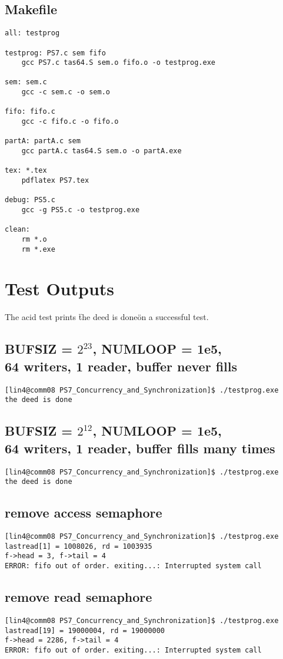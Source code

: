 \documentclass[12pt]{article}
\begin{document}
\subsection{Makefile}

\begin{lstlisting}
all: testprog

testprog: PS7.c sem fifo
    gcc PS7.c tas64.S sem.o fifo.o -o testprog.exe

sem: sem.c
    gcc -c sem.c -o sem.o

fifo: fifo.c
    gcc -c fifo.c -o fifo.o

partA: partA.c sem
    gcc partA.c tas64.S sem.o -o partA.exe

tex: *.tex
    pdflatex PS7.tex

debug: PS5.c
    gcc -g PS5.c -o testprog.exe

clean:
    rm *.o
    rm *.exe
\end{lstlisting}

\section {Test Outputs}

The acid test prints \"the deed is done\" on a successful test.

\subsection {BUFSIZ = $2^{23}$, NUMLOOP = 1e5, \\
64 writers, 1 reader, buffer never fills}
\begin{lstlisting}
[lin4@comm08 PS7_Concurrency_and_Synchronization]$ ./testprog.exe 
the deed is done
\end{lstlisting}

\subsection {BUFSIZ = $2^{12}$, NUMLOOP = 1e5, \\
64 writers, 1 reader, buffer fills many times}
\begin{lstlisting}
[lin4@comm08 PS7_Concurrency_and_Synchronization]$ ./testprog.exe 
the deed is done
\end{lstlisting}

\subsection {remove access semaphore}
\begin{lstlisting}
[lin4@comm08 PS7_Concurrency_and_Synchronization]$ ./testprog.exe 
lastread[1] = 1008026, rd = 1003935
f->head = 3, f->tail = 4
ERROR: fifo out of order. exiting...: Interrupted system call
\end{lstlisting}

\subsection {remove read semaphore}
\begin{lstlisting}
[lin4@comm08 PS7_Concurrency_and_Synchronization]$ ./testprog.exe 
lastread[19] = 19000004, rd = 19000000
f->head = 2286, f->tail = 4
ERROR: fifo out of order. exiting...: Interrupted system call
\end{lstlisting}
\end{document}
